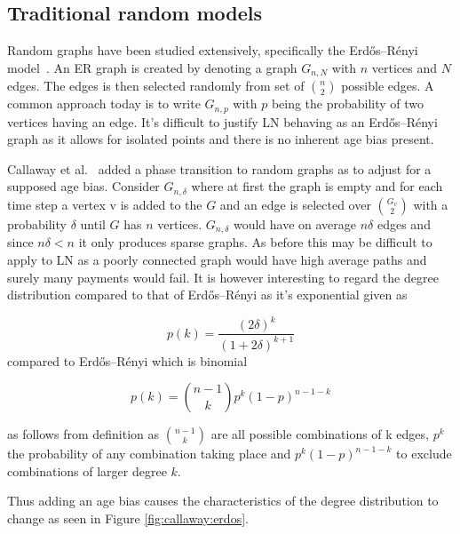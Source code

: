 \subsection{Traditional random models}

Random graphs have been studied extensively, specifically the Erdős–Rényi model~\cite{erdos:renyi:random:graphs}. An ER graph is created by denoting a graph $G_{n,N}$ with $n$ vertices and $N$ edges. The edges is then selected randomly from set of ${n \choose 2}$ possible edges. A common approach today is to write $G_{n,p}$ with $p$ being the probability of two vertices having an edge. It's difficult to justify LN behaving as an Erdős–Rényi graph as it allows for isolated points and there is no inherent age bias present. 

Callaway et al.~\cite{callaway:hopcraft:randomly:grown:graphs} added a phase transition to random graphs as to adjust for a supposed age bias. Consider $G_{n,\delta}$ where at first the graph is empty and for each time step a vertex v is added to the $G$ and an edge is selected over $G_v \choose 2$ with a probability $\delta$ until $G$ has $n$ vertices. $G_{n,\delta}$ would have on average $n\delta$ edges and since $n\delta < n$ it only produces sparse graphs. As before this may be difficult to apply to LN as a poorly connected graph would have high average paths and surely many payments would fail. It is however interesting to regard the \gls{degree distribution} compared to that of Erdős–Rényi as it's exponential given as

\begin{equation}
	p(k) = \dfrac{(2\delta)^k}{(1 + 2\delta)^{k+1}} 
	\label{eq:callaway}
\end{equation}
compared to Erdős–Rényi which is binomial

\begin{equation}
	p(k) = {n-1 \choose k} p^k(1-p)^{n-1-k} 
	\label{eq:erdos:renyi}
\end{equation}

as follows from definition as ${n-1 \choose k}$ are all possible combinations of k edges,  $p^k$ the probability of any combination taking place and $p^k(1-p)^{n-1-k}$ to exclude combinations of larger degree $k$.

Thus adding an age bias causes the characteristics of the \gls{degree distribution} to change as seen in Figure \ref{fig:callaway:erdos}.

